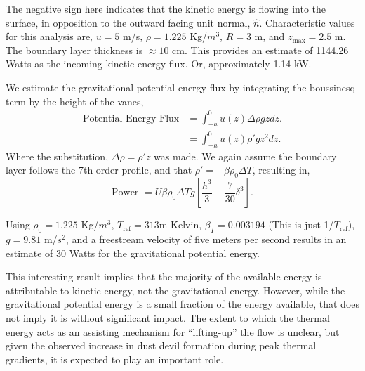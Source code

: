 
The negative sign here indicates that the kinetic energy is flowing into
the surface, in opposition to the outward facing unit normal, $\hat
n$. Characteristic values for this analysis are, $u = 5$ m/s, $\rho =
1.225$ Kg/$m^3$, $R = 3$ m, and $z_{\text{max}} = 2.5$ m. The boundary
layer thickness is $\approx 10$ cm. This provides
an estimate of 1144.26 Watts as the incoming kinetic energy flux. Or,
approximately 1.14 kW.  

We estimate the gravitational potential
energy flux by integrating the boussinesq term by the height of the vanes, 
\begin{align*}
  \text{Potential Energy Flux} & = \int_{-h}^0 u(z) \Delta \rho g z dz. \\
  & = \int_{-h}^0 u(z) \rho' g z^2 dz. 
\end{align*}
Where the substitution, $\Delta \rho = \rho' z$ was made. We again
assume the boundary layer follows the 7th order profile, and 
%
that $\rho' = -\beta \rho_0 \Delta T$, resulting in, 
%
%
\begin{equation}
 \text{Power } = U \beta \rho_0 \Delta T g \left[ \frac{h^3}{3} -
					    \frac{7}{30} \delta^3
					   \right]. 
\end{equation}

Using $\rho_0 = 1.225$ Kg/$m^3$, $T_{\text{ref}}=313$m Kelvin, $\beta_T
= 0.003194$ (This is just 1/$T_{\text{ref}}$), $g=9.81$ m/$s^2$, and a
freestream velocity of five meters per second results in an
estimate of 30 Watts for the gravitational potential energy. 

This interesting result implies that the majority of the available
energy is attributable to kinetic energy, not the gravitational
energy. 
However, while the
gravitational potential energy is a small fraction of the energy
available, that does not imply it is without significant impact. The
extent to which the thermal energy acts as an assisting mechanism for 
``lifting-up'' the flow is unclear, but given the observed increase in dust
devil formation during peak thermal gradients, it is expected
to play an important role. 

